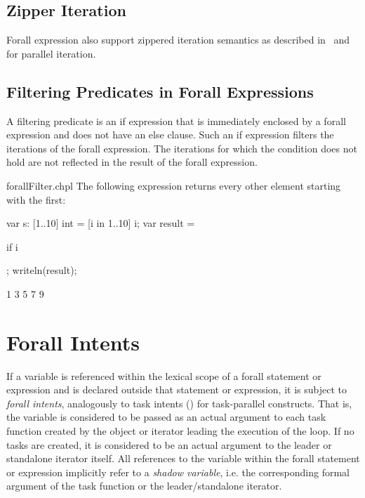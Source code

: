 \subsection{Zipper Iteration}
Forall expression also support zippered iteration semantics as
described in~ and~ for
parallel iteration.

\subsection{Filtering Predicates in Forall Expressions}
\label{Filtering_Predicates_Forall}

A filtering predicate is an if expression that is immediately enclosed
by a forall expression and does not have an
else clause.  Such an if expression filters the iterations of the
forall expression.  The iterations for which the condition does not
hold are not reflected in the result of the forall expression.

\begin{chapelexample}{forallFilter.chpl}
The following expression returns every other element starting with the
first:
\begin{chapelpre}
var s: [1..10] int = [i in 1..10] i;
var result =
\end{chapelpre}
\begin{chapel}
[i in 1..s.numElements] if i %
\end{chapel}
\begin{chapelpost}
;
writeln(result);
\end{chapelpost}
\begin{chapeloutput}
1 3 5 7 9
\end{chapeloutput}
\end{chapelexample}


\section{Forall Intents}
\label{Forall_Intents}

If a variable is referenced within the lexical scope of a
forall statement or expression and is declared outside
that statement or expression, it is subject to \emph{forall intents},
analogously to task intents ()
for task-parallel constructs. That is, the variable is considered
to be passed as an actual argument to
each task function created by the object or iterator leading
the execution of the loop. If no tasks are created,
it is considered to be an actual argument to the leader or standalone
iterator itself. All references to the variable
within the forall statement or expression implicitly refer
to a \emph{shadow variable}, i.e.
the corresponding formal argument of the task function
or the leader/standalone iterator.

